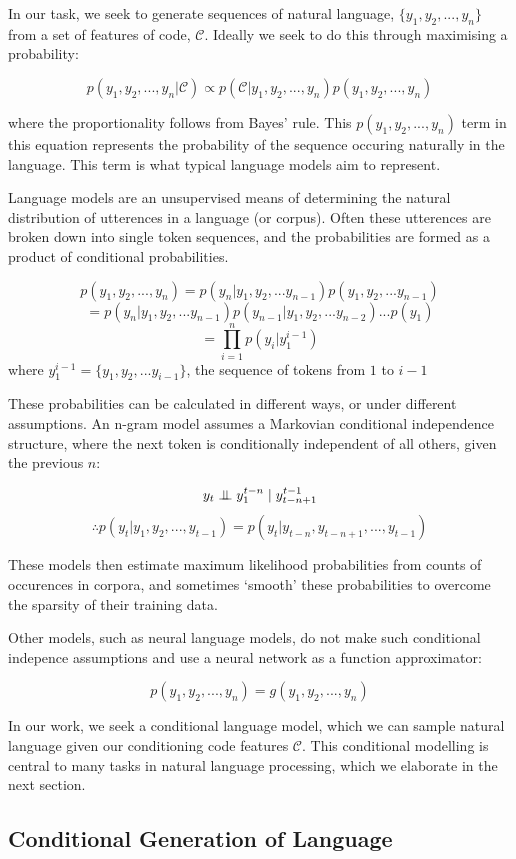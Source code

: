In our task, we seek to generate sequences of natural language, $\{y_1, y_2,..., y_n\}$ from a set of features of code, $\mathcal{C}$.
Ideally we seek to do this through maximising a probability:

$$p(y_1, y_2,...,y_n | \mathcal{C}) \propto p(\mathcal{C} | y_1, y_2,...,y_n )  p(y_1, y_2,...,y_n )$$

where the proportionality follows from Bayes' rule.
This $p(y_1, y_2,...,y_n )$ term in this equation represents the probability of the sequence occuring naturally in the language. This term is what typical language models aim to represent.

Language models are an unsupervised means of determining the natural distribution of utterences in a language (or corpus). 
Often these utterences are broken down into single token sequences, and the probabilities are formed as a product of conditional probabilities.

$$p(y_1, y_2,...,y_n ) = p(y_n | y_1, y_2,...y_{n-1} )  p(y_1, y_2,...y_{n-1} )$$
$$= p(y_n | y_1, y_2,...y_{n-1} ) p(y_{n-1} | y_1, y_2,...y_{n-2} )...p(y_1)$$
$$ = \prod_{i=1}^{n} p(y_i | y_1^{i-1} ) $$ where $y_1^{i-1} =  \{y_1, y_2,...y_{i-1}\}$, the sequence of tokens from $1$ to $i-1$

These probabilities can be calculated in different ways, or under different assumptions. An n-gram model assumes a Markovian conditional independence structure, where the next token is conditionally independent of all others, given the previous $n$: 

$$ y_t \mathrel{\perp\mspace{-10mu}\perp} y_1^{t-n} \mid y^{t-1}_{t-n+1} $$
$$\therefore p(y_t | y_1, y_2,..., y_{t-1} )  = p(y_t | y_{t-n}, y_{t-n+1},..., y_{t-1}  ) $$

These models then estimate maximum likelihood probabilities from counts of occurences in corpora, and sometimes `smooth' these probabilities to overcome the sparsity of their training data.

Other models, such as neural language models, do not make such conditional indepence assumptions and use a neural network as a function approximator:

$$p(y_1, y_2,...,y_n ) = g(y_1, y_2,...,y_n)$$

In our work, we seek a conditional language model, which we can sample natural language given our conditioning code features $\mathcal{C}$. This conditional modelling is central to many tasks in natural language processing, which we elaborate in the next section.

\subsection{Conditional Generation of Language}

